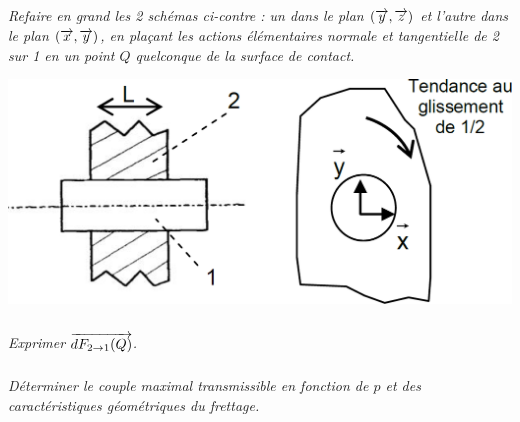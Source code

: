 \documentclass[10pt]{article}
\begin{document}
\begin{minipage}[c]{.55\linewidth}
\subparagraph{}
\textit{Refaire en grand les 2 schémas ci-contre : un 
dans le plan $(\overrightarrow{y}, \overrightarrow{z})$ et l’autre dans le plan $(\overrightarrow{x}, \overrightarrow{y})$, 
en plaçant les actions élémentaires normale et 
tangentielle de 2 sur 1 en un point $Q$ 
quelconque de la surface de contact. }


\end{minipage}\hfill
\begin{minipage}[c]{.4\linewidth}
\begin{center}
\includegraphics[width=.9\textwidth]{images/fig_05}
\end{center}
\end{minipage}


\subparagraph{}
\textit{Exprimer $\overrightarrow{dF_{2\rightarrow 1}(Q)}$.}

\subparagraph{}
\textit{Déterminer le couple maximal transmissible en fonction de $p$ et des 
caractéristiques géométriques du frettage.}
\end{document}
